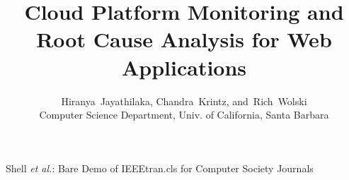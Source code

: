 \documentclass[10pt,journal,compsoc]{IEEEtran}
\begin{document}




%

\title{\LARGE Cloud Platform Monitoring and Root Cause Analysis for Web Applications}
\author{Hiranya~Jayathilaka,
        Chandra~Krintz,
        and~Rich~Wolski\\
Computer Science Department, Univ. of California, Santa Barbara}

%                                                                                                         
{Shell \MakeLowercase{\textit{et al.}}: Bare Demo of IEEEtran.cls for Computer Society Journals}

\end{document}
